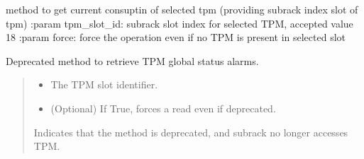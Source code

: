 \documentclass[letterpaper,10pt,english]{sphinxmanual}
\begin{document}
\begin{fulllineitems}
\begin{fulllineitems}
\end{fulllineitems}


\begin{fulllineitems}
\label{\detokenize{apidocs:subrack_management_board.SubrackMngBoard.GetTPMCurrent}}
\pysigstartsignatures
{}
\pysigstopsignatures
\sphinxAtStartPar
method to get current consuptin of selected tpm (providing subrack index slot of tpm)
:param tpm\_slot\_id: subrack slot index for selected TPM, accepted value 1\sphinxhyphen{}8
:param force: force the operation even if no TPM is present in selected slot

\end{fulllineitems}


\begin{fulllineitems}
\label{\detokenize{apidocs:subrack_management_board.SubrackMngBoard.GetTPMGlobalStatusAlarm}}
\pysigstartsignatures
{}
\pysigstopsignatures
\sphinxAtStartPar
Deprecated method to retrieve TPM global status alarms.
\begin{quote}\begin{description}
\begin{itemize}
\item {} 
\sphinxAtStartPar
{} \textendash{} The TPM slot identifier.

\item {} 
\sphinxAtStartPar
{} \textendash{} (Optional) If True, forces a read even if deprecated.

\end{itemize}

\sphinxAtStartPar
{\hyperref[\detokenize{apidocs:subrack_management_board.SubrackExecFault}]{}} \textendash{} Indicates that the method is deprecated, and
subrack no longer accesses TPM.


\end{description}
\end{quote}
\end{fulllineitems}
\end{fulllineitems}
\end{document}
